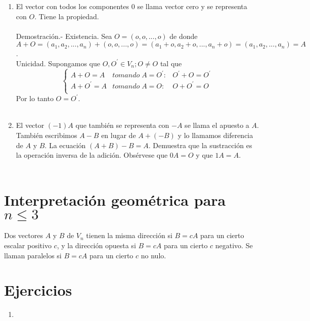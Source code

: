 \begin{teo}
\begin{enumerate}[\bfseries a.]
    \item El vector con todos los componentes $0$ se llama vector cero y se representa con $O$. Tiene la propiedad.\\\\
	Demostración.-\; Existencia. Sea $O = (o,o,...,o)$ de donde $A+O = (a_1,a_2,...,a_n)+(o,o,...,o) = (a_1+o,a_2+o,...,a_n+o) = (a_1,a_2,...,a_n) = A$.\\
	Unicidad. Supongamos que $O,O^{'} \in V_n; O\neq O$ tal que 
	$$\left\{ \begin{array}{ccc} A+O=A&tomando \; A=O^{'}:&O^{'}+O = O^{'}\\ A+O^{'} = A&tomando \; A=O:&O+O^{'}=O\\ \end{array} \right.$$
	Por lo tanto $O=O^{'}$.\\\\
    \item El vector $(-1)A$ que también se representa con $-A$ se llama el apuesto a $A$. También escribimos $A-B$ en lugar de $A+(-B)$ y lo llamamos diferencia de $A$ y $B$. La ecuación $(A+B)-B=A$. Demuestra que la sustracción es la operación inversa de la adición. Obsérvese que $0A=O$ y que $1A=A$.\\\\

\end{enumerate}
    
\end{teo}

\section{Interpretación geométrica para $n\leq 3$}

\begin{tcolorbox}[colframe = white]

    \begin{def.} Dos vectores $A$ y $B$ de $V_n$ tienen la misma dirección si $B=cA$ para un cierto escalar positivo $c$, y la dirección opuesta si $B=cA$ para un cierto $c$ negativo. Se llaman paralelos si $B=cA$ para un cierto $c$ no nulo.
    \end{def.}
\end{tcolorbox}

\section{Ejercicios}
\begin{enumerate}

\item

\end{enumerate}

